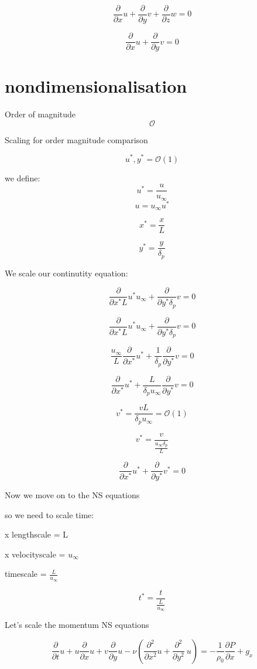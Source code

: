 \documentclass[11pt]{article}
\begin{document}
$$\frac{\partial }{\partial x} u + \frac{\partial}{\partial y} v + \frac{\partial}{\partial z} w=0$$

$$\frac{\partial }{\partial x} u + \frac{\partial}{\partial y} v =0 $$

\section{nondimensionalisation}
Order of magnitude
$$\mathcal{O}$$

Scaling for order magnitude comparison 

$$u^* , y^* =\mathcal{O}(1)$$


we define:
$$u^* = \frac{u}{u_\infty}$$
$$u = u_\infty u^*$$

$$x^* = \frac{x}{L}$$

$$y^* = \frac{y}{\delta_p}$$

We scale our continutity equation:

$$\frac{\partial }{\partial x^* L} u^* u_\infty + \frac{\partial}{\partial y^* \delta_p} v =0 $$

$$\frac{\partial }{\partial x^* L} u^* u_\infty + \frac{\partial}{\partial y^* \delta_p} v =0 $$

$$ \frac{u_\infty}{L} \frac{\partial }{\partial x^* } u^* + \frac{1}{\delta_p}\frac{\partial}{\partial y^*} v =0 $$


$$\frac{\partial }{\partial x^* } u^* + \frac{L}{\delta_p u_\infty}\frac{\partial}{\partial y^*} v =0 $$

$$v^*=\frac{vL}{\delta_p u_\infty}=  \mathcal{O}(1)$$

$$v^* = \frac{v}{\frac{u_\infty \delta_p}{L}}$$

$$\frac{\partial }{\partial x^* } u^* + \frac{\partial}{\partial y^*} v^* =0 $$

Now we move on to the NS equations

so we need to scale time:

x lengthscale = L

x velocityscale = $u_\infty$

timescale = $\frac{L}{u_\infty}$

$$t^* = \frac{t}{\frac{L}{u_\infty}}$$

Let's scale the momentum NS equations 

$$\frac{\partial }{\partial t} u + u \frac{\partial}{\partial x} u + v \frac{\partial}{\partial y} u - \nu ( \frac{\partial^2}{\partial x^2} u + \frac{\partial^2}{\partial y^2} \ u ) = - \frac{1}{\rho_0} \frac{\partial P}{\partial x} +g_x$$
\end{document}
